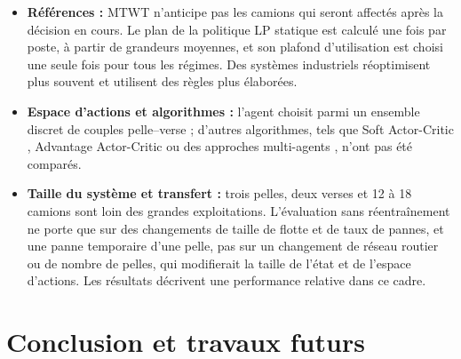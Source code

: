 \documentclass[11pt,a4paper]{article}
\newif\ifrevmarks
\newcommand{\revtag}[1]{\ifrevmarks\textsuperscript{\textcolor{red!70!black}{\scriptsize[#1]}}\fi}
\newenvironment{revbloc}[1]{\par\ifrevmarks\color{revcolor}\noindent\revtag{#1}\ \fi}{\par}
\newif\ifcorrmarks
\newcommand{\corr}[1]{\ifcorrmarks\textcolor{corrcolor}{#1}\else#1\fi}
\begin{document}
\begin{revbloc}{M7, M8, M9, M11, M12, M25, N1--N5, v3, T31}
\begin{itemize}
  \item \textbf{Références :} MTWT n'anticipe pas les camions qui seront affectés après la décision en cours. Le plan de la politique \corr{LP statique} est calculé une fois par poste, à partir de grandeurs moyennes, et son plafond d'utilisation est choisi une seule fois pour tous les régimes. Des systèmes industriels réoptimisent plus souvent et utilisent des règles plus élaborées.
  \item \textbf{Espace d'actions et algorithmes :} l'agent choisit parmi un ensemble discret de couples pelle--verse ; d'autres algorithmes, tels que Soft Actor-Critic \cite{Haarnoja2018, SampsonNwachukwu2025}, Advantage Actor-Critic ou des approches multi-agents \cite{Zhao2025}, n'ont pas été comparés.
  \item \textbf{Taille du système et transfert :} trois pelles, deux verses et 12 à 18 camions sont loin des grandes exploitations. L'évaluation sans réentraînement ne porte que sur des changements de taille de flotte et de taux de pannes\corr{, et une panne temporaire d'une pelle}, pas sur un changement de réseau routier ou de nombre de pelles, qui modifierait la taille de l'état et de l'espace d'actions. Les résultats décrivent une performance relative dans ce cadre.
\end{itemize}
\end{revbloc}

\section{Conclusion et travaux futurs}
\label{sec:conclusion}
\end{document}
